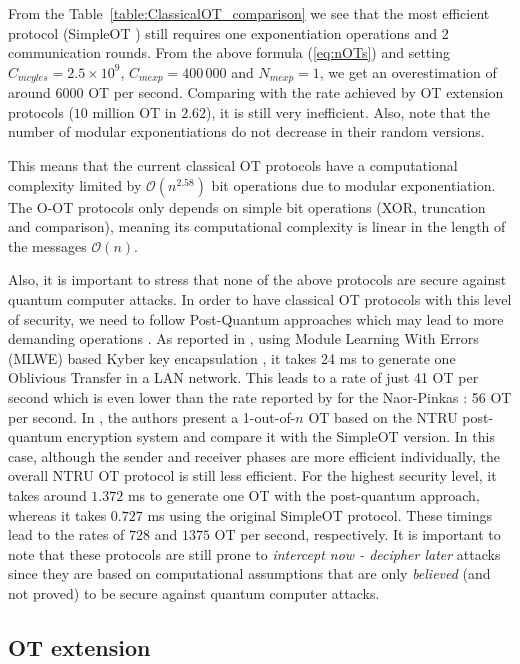 From the Table~\ref{table:ClassicalOT_comparison} we see that the most efficient protocol (SimpleOT \cite{CO15}) still requires one exponentiation operations and $2$ communication rounds. From the above formula (\ref{eq:nOTs}) and setting $C_{mcyles} = 2.5 \times 10^9$, $C_{mexp} = 400\,000$ and $N_{mexp} = 1$, we get an overestimation of around $6 000$ OT per second. Comparing with the rate achieved by OT extension protocols ($10$ million OT in $2.62$), it is still very inefficient. Also, note that the number of modular exponentiations do not decrease in their random versions. 

This means that the current classical OT protocols have a computational complexity limited by $\mathcal{O}(n^{2.58})$ bit operations due to modular exponentiation. The O-OT protocols only depends on simple bit operations (XOR, truncation and comparison), meaning its computational complexity is linear in the length of the messages $\mathcal{O}(n)$.

Also, it is important to stress that none of the above protocols are secure against quantum computer attacks. In order to have classical OT protocols with this level of security, we need to follow Post-Quantum approaches which may lead to more demanding operations \cite{PST19}. As reported in \cite{MR19}, using Module Learning With Errors (MLWE) based Kyber key encapsulation \cite{CrystalKyber17}, it takes 24 ms to generate one Oblivious Transfer in a LAN network. This leads to a rate of just 41 OT per second which is even lower than the rate reported by \cite{ALSZ13} for the Naor-Pinkas \cite{NP01}: 56 OT per second. In \cite{NTRUOT1, NTRUOT2}, the authors present a 1-out-of-$n$ OT based on the NTRU post-quantum encryption system \cite{NTRU} and compare it with the SimpleOT \cite{CO15} version. In this case, although the sender and receiver phases are more efficient individually, the overall NTRU OT protocol is still less efficient. For the highest security level, it takes around $1.372$ ms to generate one OT with the post-quantum approach, whereas it takes $0.727$ ms using the original SimpleOT protocol. These timings lead to the rates of $728$ and $1375$ OT per second, respectively. It is important to note that these protocols are still prone to \textit{intercept now - decipher later} attacks since they are based on computational assumptions that are only \textit{believed} (and not proved) to be secure against quantum computer attacks.


\subsection{OT extension} \label{Ext-OT_comp}

